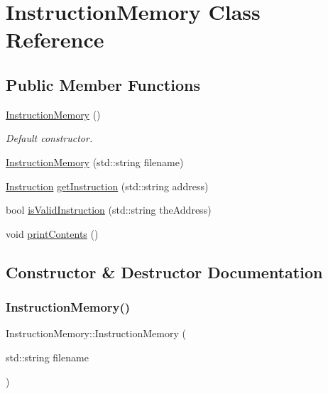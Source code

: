 \hypertarget{class_instruction_memory}{}\section{Instruction\+Memory Class Reference}
\label{class_instruction_memory}
\subsection*{Public Member Functions}
\begin{DoxyCompactItemize}
\item 
\mbox{\label{class_instruction_memory_ab8cf52c9d90ee839882175f1f0d092da}} 
\mbox{\hyperlink{class_instruction_memory_ab8cf52c9d90ee839882175f1f0d092da}{Instruction\+Memory}} ()
\begin{DoxyCompactList}\small\item\em Default constructor. \end{DoxyCompactList}\item 
\mbox{\hyperlink{class_instruction_memory_a9e98dfb1c96db56d02cbd1a7aed31ec7}{Instruction\+Memory}} (std\+::string filename)
\item 
\mbox{\hyperlink{class_instruction}{Instruction}} \mbox{\hyperlink{class_instruction_memory_a9991daa81af7611a8ff76bbbd4b64630}{get\+Instruction}} (std\+::string address)
\item 
bool \mbox{\hyperlink{class_instruction_memory_a530d8236c9ddb2827d13a17bb5a6cdd6}{is\+Valid\+Instruction}} (std\+::string the\+Address)
\item 
void \mbox{\hyperlink{class_instruction_memory_a56a478d5ce8327bf58c9d726898921f8}{print\+Contents}} ()
\end{DoxyCompactItemize}


\subsection{Constructor \& Destructor Documentation}
\mbox{\label{class_instruction_memory_a9e98dfb1c96db56d02cbd1a7aed31ec7}} 
\subsubsection{\texorpdfstring{Instruction\+Memory()}{InstructionMemory()}}
{\footnotesize\ttfamily Instruction\+Memory\+::\+Instruction\+Memory (\begin{DoxyParamCaption}\item[{std\+::string}]{filename }\end{DoxyParamCaption})}

